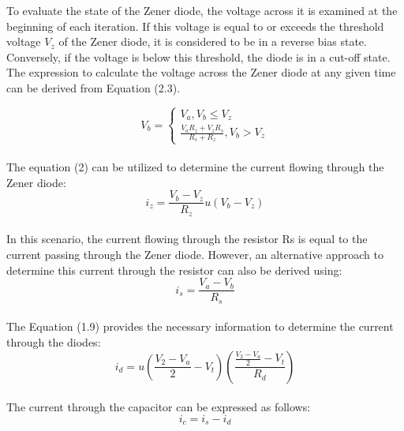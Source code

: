 To evaluate the state of the Zener diode, the voltage across it is examined at the beginning of each iteration. If this voltage is equal to or exceeds the threshold voltage $V_z$ of the Zener diode, it is considered to be in a reverse bias state. Conversely, if the voltage is below this threshold, the diode is in a cut-off state. The expression to calculate the voltage across the Zener diode at any given time can be derived from Equation (2.3).

\begin{equation}
    V_b=\begin{cases}
        V_a, V_b \leq V_z\\
        \frac{V_aR_z+V_zR_s}{R_s+R_z}, V_b>V_z
    \end{cases}
\end{equation}\\

The equation (2) can be utilized to determine the current flowing through the Zener diode:\\

\begin{equation}
    i_z=\frac{V_b-V_z}{R_z}u(V_b-V_z)
\end{equation}\\

In this scenario, the current flowing through the resistor Rs is equal to the current passing through the Zener diode. However, an alternative approach to determine this current through the resistor can also be derived using:\\

\begin{equation}
    i_s=\frac{V_a-V_b}{R_s}
\end{equation}\\

The Equation (1.9) provides the necessary information to determine the current through the diodes:\\

\begin{equation}
    i_d=u(\frac{V_2-V_a}{2}-V_t)(\frac{\frac{V_2-V_a}{2}-V_t}{R_d})
\end{equation}\\

The current through the capacitor can be expressed as follows:\\

\begin{equation}
    i_c=i_s-i_d
\end{equation}\\

